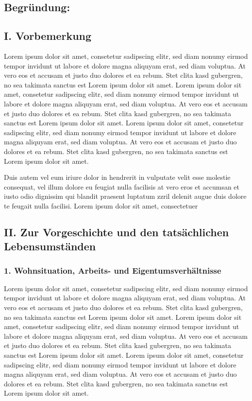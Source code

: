 \documentclass[
  12pt,
  a4paper,
]{article}
\begin{document}
\subsection{Begründung:}\label{begruxfcndung}

\subsection{I. Vorbemerkung}\label{i.-vorbemerkung}

Lorem ipsum dolor sit amet, consetetur sadipscing elitr, sed diam nonumy
eirmod tempor invidunt ut labore et dolore magna aliquyam erat, sed diam
voluptua. At vero eos et accusam et justo duo dolores et ea rebum. Stet
clita kasd gubergren, no sea takimata sanctus est Lorem ipsum dolor sit
amet. Lorem ipsum dolor sit amet, consetetur sadipscing elitr, sed diam
nonumy eirmod tempor invidunt ut labore et dolore magna aliquyam erat,
sed diam voluptua. At vero eos et accusam et justo duo dolores et ea
rebum. Stet clita kasd gubergren, no sea takimata sanctus est Lorem
ipsum dolor sit amet. Lorem ipsum dolor sit amet, consetetur sadipscing
elitr, sed diam nonumy eirmod tempor invidunt ut labore et dolore magna
aliquyam erat, sed diam voluptua. At vero eos et accusam et justo duo
dolores et ea rebum. Stet clita kasd gubergren, no sea takimata sanctus
est Lorem ipsum dolor sit amet.

Duis autem vel eum iriure dolor in hendrerit in vulputate velit esse
molestie consequat, vel illum dolore eu feugiat nulla facilisis at vero
eros et accumsan et iusto odio dignissim qui blandit praesent luptatum
zzril delenit augue duis dolore te feugait nulla facilisi. Lorem ipsum
dolor sit amet, consectetuer

\subsection{II. Zur Vorgeschichte und den tatsächlichen
Lebensumständen}\label{ii.-zur-vorgeschichte-und-den-tatsuxe4chlichen-lebensumstuxe4nden}

\subsubsection{1. Wohnsituation, Arbeits- und
Eigentumsverhältnisse}\label{wohnsituation-arbeits--und-eigentumsverhuxe4ltnisse}

Lorem ipsum dolor sit amet, consetetur sadipscing elitr, sed diam nonumy
eirmod tempor invidunt ut labore et dolore magna aliquyam erat, sed diam
voluptua. At vero eos et accusam et justo duo dolores et ea rebum. Stet
clita kasd gubergren, no sea takimata sanctus est Lorem ipsum dolor sit
amet. Lorem ipsum dolor sit amet, consetetur sadipscing elitr, sed diam
nonumy eirmod tempor invidunt ut labore et dolore magna aliquyam erat,
sed diam voluptua. At vero eos et accusam et justo duo dolores et ea
rebum. Stet clita kasd gubergren, no sea takimata sanctus est Lorem
ipsum dolor sit amet. Lorem ipsum dolor sit amet, consetetur sadipscing
elitr, sed diam nonumy eirmod tempor invidunt ut labore et dolore magna
aliquyam erat, sed diam voluptua. At vero eos et accusam et justo duo
dolores et ea rebum. Stet clita kasd gubergren, no sea takimata sanctus
est Lorem ipsum dolor sit amet.
\end{document}
